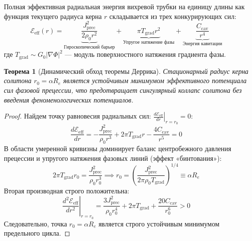 \documentclass[12pt,a4paper]{article}
\newtheorem{theorem}{Теорема}
\begin{document}
	Полная эффективная радиальная энергия вихревой трубки на единицу длины как функция текущего радиуса керна $r$ складывается из трех конкурирующих сил:
	\begin{equation}
		\mathcal{E}_{\text{eff}}(r) = \underbrace{\frac{J_{\text{prec}}^2}{2 \rho_0 r^2}}_{\text{Гироскопический барьер}} + \underbrace{\pi T_{\text{grad}} r^2}_{\text{Упругое натяжение фазы}} + \underbrace{\frac{C_{\text{cav}}}{r^4}}_{\text{Энергия кавитации}}
	\end{equation}
	где $T_{\text{grad}} \sim G_0 |\nabla \Phi|^2$ — модуль поверхностного натяжения градиента фазы.
	
	\begin{theorem}[Динамический обход теоремы Деррика]
		Стационарный радиус керна солитона $r_0 = \alpha R_e$ является устойчивым минимумом эффективного потенциала сил фазовой прецессии, что предотвращает сингулярный коллапс солитона без введения феноменологических потенциалов.
	\end{theorem}
	
	\begin{proof}
		Найдем точку равновесия радиальных сил: $\left. \frac{d\mathcal{E}_{\text{eff}}}{dr} \right|_{r=r_0} = 0$:
		\begin{equation}
			\frac{d\mathcal{E}_{\text{eff}}}{dr} = -\frac{J_{\text{prec}}^2}{\rho_0 r^3} + 2\pi T_{\text{grad}} r - \frac{4 C_{\text{cav}}}{r^5} = 0
		\end{equation}
		В области умеренной кривизны доминирует баланс центробежного давления прецессии и упругого натяжения фазовых линий (эффект «бинтования»):
		\begin{equation}
			2\pi T_{\text{grad}} r_0 = \frac{J_{\text{prec}}^2}{\rho_0 r_0^3} \implies r_0 = \left( \frac{J_{\text{prec}}^2}{2\pi \rho_0 T_{\text{grad}}} \right)^{1/4} \equiv \alpha R_e
		\end{equation}
		Вторая производная строго положительна:
		\begin{equation}
			\left. \frac{d^2\mathcal{E}_{\text{eff}}}{dr^2} \right|_{r=r_0} = \frac{3 J_{\text{prec}}^2}{\rho_0 r_0^4} + 2\pi T_{\text{grad}} + \frac{20 C_{\text{cav}}}{r_0^6} > 0
		\end{equation}
		Следовательно, точка $r_0 = \alpha R_e$ является строго устойчивым минимумом предельного цикла.
	\end{proof}
	
\end{document}
